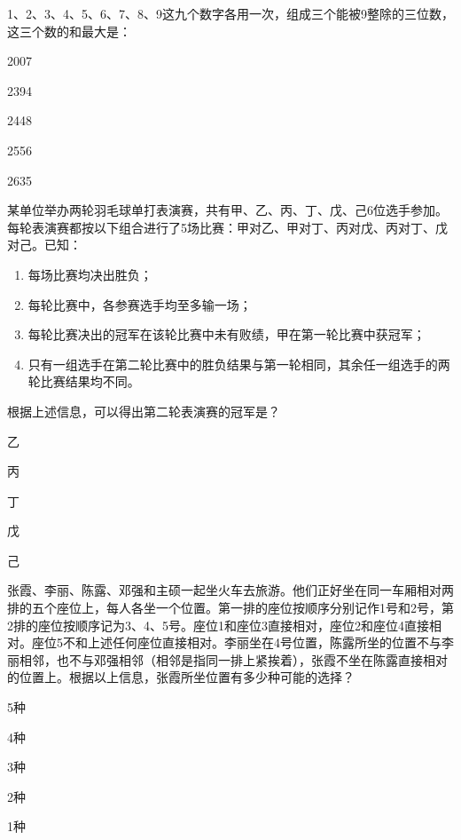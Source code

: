 \documentclass{exam-zh}
\begin{document}
\begin{question}
  1、2、3、4、5、6、7、8、9这九个数字各用一次，组成三个能被9整除的三位数，这三个数的和最大是： \paren

  \begin{choices}
    \item 2007
    \item 2394
    \item 2448
    \item 2556
    \item 2635
  \end{choices}
\end{question}

\begin{question}
  某单位举办两轮羽毛球单打表演赛，共有甲、乙、丙、丁、戊、己6位选手参加。每轮表演赛都按以下组合进行了5场比赛：甲对乙、甲对丁、丙对戊、丙对丁、戊对己。已知：
  \begin{enumerate}
    \item 每场比赛均决出胜负；
    \item 每轮比赛中，各参赛选手均至多输一场；
    \item 每轮比赛决出的冠军在该轮比赛中未有败绩，甲在第一轮比赛中获冠军；
    \item 只有一组选手在第二轮比赛中的胜负结果与第一轮相同，其余任一组选手的两轮比赛结果均不同。
  \end{enumerate}
  根据上述信息，可以得出第二轮表演赛的冠军是？ \paren

  \begin{choices}
    \item 乙
    \item 丙
    \item 丁
    \item 戊
    \item 己
  \end{choices}
\end{question}

\begin{question}
  张霞、李丽、陈露、邓强和主硕一起坐火车去旅游。他们正好坐在同一车厢相对两排的五个座位上，每人各坐一个位置。第一排的座位按顺序分别记作1号和2号，第2排的座位按顺序记为3、4、5号。座位1和座位3直接相对，座位2和座位4直接相对。座位5不和上述任何座位直接相对。李丽坐在4号位置，陈露所坐的位置不与李丽相邻，也不与邓强相邻（相邻是指同一排上紧挨着），张霞不坐在陈露直接相对的位置上。根据以上信息，张霞所坐位置有多少种可能的选择？ \paren

  \begin{choices}
    \item 5种
    \item 4种
    \item 3种
    \item 2种
    \item 1种
  \end{choices}
\end{question}
\end{document}
